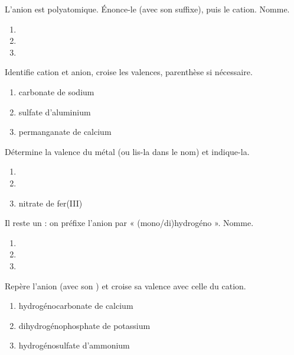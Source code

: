 \documentclass[11pt,a4paper]{article}
\begin{document}
\begin{exo}
L'anion est polyatomique. Énonce-le (avec son suffixe), puis le cation. Nomme.
\begin{enumerate}[label=\alph*)]
  \item {}
  \item {}
  \item {}
\end{enumerate}
\end{exo}

\begin{exo}
Identifie cation et anion, croise les valences, parenthèse si nécessaire.
\begin{enumerate}[label=\alph*)]
  \item carbonate de sodium
  \item sulfate d'aluminium
  \item permanganate de calcium
\end{enumerate}
\end{exo}

\begin{exo}
Détermine la valence du métal (ou lis-la dans le nom) et indique-la.
\begin{enumerate}[label=\alph*)]
  \item {}
  \item {}
  \item nitrate de fer(III)
\end{enumerate}
\end{exo}

\begin{exo}
Il reste un  : on préfixe l'anion par « (mono/di)hydrogéno ». Nomme.
\begin{enumerate}[label=\alph*)]
  \item {}
  \item {}
  \item {}
\end{enumerate}
\end{exo}

\begin{exo}
Repère l'anion (avec son ) et croise sa valence avec celle du cation.
\begin{enumerate}[label=\alph*)]
  \item hydrogénocarbonate de calcium
  \item dihydrogénophosphate de potassium
  \item hydrogénosulfate d'ammonium
\end{enumerate}
\end{exo}
\end{document}
